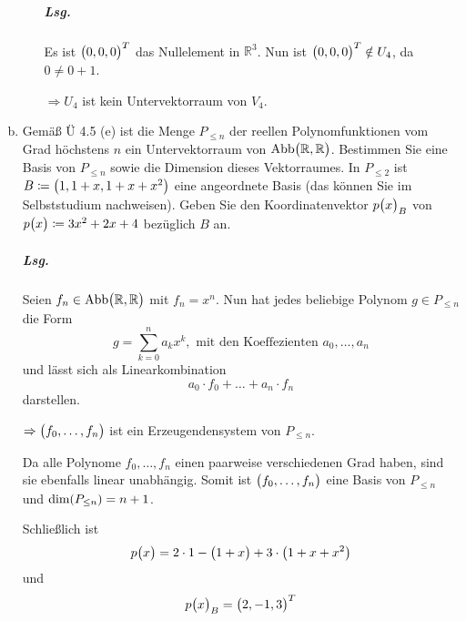 \documentclass{scrreprt}
\begin{document}
\begin{enumerate}[(a)]
\begin{enumerate}[(i)]
    \subparagraph{Lsg.} Es ist $\qty\big(0, 0, 0)^T$ das Nullelement in
    $\mathbb{R}^3$.
    Nun ist $\qty\big(0, 0, 0)^T \notin U_4$, da $0 \ne 0 + 1$.

    $\Rightarrow U_4$ ist kein Untervektorraum von $V_4$.
  \end{enumerate}

\item Gemäß Ü 4.5 (e) ist die Menge $P_{\leq n}$ der reellen Polynomfunktionen
  vom Grad höchstens $n$ ein Untervektorraum von
  $\text{Abb}\qty\big(\mathbb{R}, \mathbb{R})$.
  Bestimmen Sie eine Basis von $P_{\leq n}$ sowie die
  Dimension dieses Vektorraumes.
  In $P_{\leq 2}$ ist $B \coloneqq \qty\big(1, 1 + x, 1 + x + x^2)$ eine
  angeordnete Basis (das können Sie im Selbststudium nachweisen).
  Geben Sie den Koordinatenvektor $p\qty\big(x)_B$ von
  $p\qty\big(x) \coloneqq 3x^2 + 2x + 4$ bezüglich $B$ an.

  \subparagraph{Lsg.} Seien $f_n \in \text{Abb}\qty\big(\mathbb{R}, \mathbb{R})$
  mit $f_n = x^n$.
  Nun hat jedes beliebige Polynom $g \in P_{\leq n}$ die Form
  \[
    g = \sum_{k = 0}^n a_k x^k, \text{ mit den Koeffezienten } a_0, \ldots, a_n
  \]
  und lässt sich als Linearkombination
  \[
    a_0 \cdot f_0 + \ldots + a_n \cdot f_n
  \]
  darstellen.

  $\Rightarrow \qty\big(f_0, \ldots, f_n)$ ist ein Erzeugendensystem von
  $P_{\leq n}$.

  Da alle Polynome $f_0, \ldots, f_n$ einen paarweise verschiedenen Grad haben,
  sind sie ebenfalls linear unabhängig.
  Somit ist $\qty\big(f_0, \ldots, f_n)$ eine Basis von $P_{\leq n}$ und
  $\text{dim}\qty(P_{\leq n}) = n + 1$.

  Schließlich ist
  \[
    p\qty\big(x) = 2 \cdot 1 - \qty\big(1 + x) + 3 \cdot \qty\big(1 + x + x^2)
  \]
  und
  \[
    p\qty\big(x)_B = \qty\big(2, -1, 3)^T
  \]
\end{enumerate}
\end{document}
